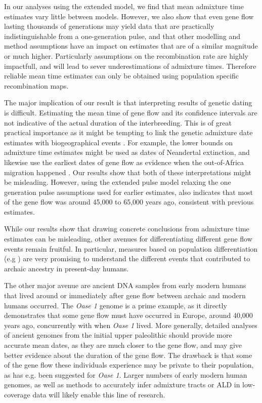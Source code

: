 \documentclass[]{article}
\begin{document}
In our analyses using the extended model, we find that mean admixture time estimates vary little between models. However, we also show that even gene flow lasting thousands of generations may yield data that are practically indistinguishable from a one-generation pulse, and that other modelling and method assumptions have an impact on estimates that are of a similar magnitude or much higher. Particularly assumptions on the recombination rate are highly impactfull, and will lead to sever underestimations of admixture times. Therefore reliable mean time estimates can only be obtained using population specific recombination maps.

The major implication of our result is that interpreting results of genetic dating is difficult.  Estimating the mean time of gene flow and its confidence intervals are not indicative of the actual duration of the interbreeding.  This is of great practical importance as it might be tempting to link the genetic admixture date estimates with biogeographical events \citep{sankararaman_date_2012,lazaridis_genomic_2016,jacobs_multiple_2019,vyas_analyses_2019,douka_age_2019}. For example, the lower bounds on admixture time estimates might be used as dates of Neandertal extinction, and likewise use the earliest dates of gene flow as evidence when the out-of-Africa migration happened \citep{sankararaman_date_2012}. Our results show that both of these interpretations might be misleading. However, using the extended pulse model relaxing the one generation pulse assumptions used for earlier estimates, also indicates that most of the gene flow was around 45,000 to 65,000 years ago, consistent with previous estimates.


While our results show that drawing concrete conclusions from admixture time estimates can be misleading, other avenues for differentiating different gene flow events remain fruitful.
In particular, measures based on population differentiation (e.g \citep{browning_analysis_2018,wall_higher_2013,villanea_multiple_2019}) are very promising to understand the different events that contributed to archaic ancestry in present-day humans. 

The other major avenue are ancient DNA samples from early modern humans that lived around or immediately after gene flow between archaic and modern humans occurred. The \textit{Oase 1} \citep{fu_genome_2014} genome is a prime example, as it directly demonstrates that some gene flow must have occurred in Europe, around 40,000 years ago, concurrently with when \textit{Oase 1} lived. More generally, detailed analyses of ancient genomes from the initial upper paleolithic should provide more accurate mean dates, as they are much closer to the gene flow, and may give better evidence about the duration of the gene flow. The drawback is that some of the gene flow these individuals experience may be private to their population, as has e.g. been suggested for \textit{Oase 1}. Larger numbers of early modern human genomes, as well as methods to accurately infer admixture tracts or ALD in low-coverage data will likely enable this line of research. 
\end{document}
